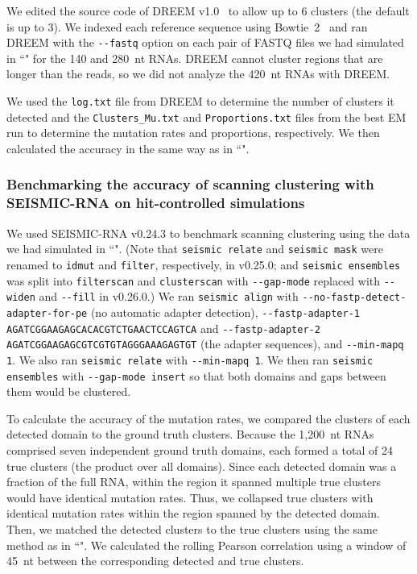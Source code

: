 \documentclass[unnumsec,webpdf,contemporary,large]{oup-authoring-template}%
\theoremstyle{thmstyleone}%
\theoremstyle{thmstyletwo}%
\theoremstyle{thmstylethree}%
\begin{document}
We edited the source code of DREEM v1.0~\cite{Tomezsko2020} to allow up to 6 clusters (the default is up to 3).
We indexed each reference sequence using Bowtie~2~\cite{Langmead2012} and ran DREEM with the \verb|--fastq| option on each pair of FASTQ files we had simulated in ``" for the 140 and 280~nt RNAs.
DREEM cannot cluster regions that are longer than the reads, so we did not analyze the 420~nt RNAs with DREEM.

We used the \verb|log.txt| file from DREEM to determine the number of clusters it detected and the \verb|Clusters_Mu.txt| and \verb|Proportions.txt| files from the best EM run to determine the mutation rates and proportions, respectively.
We then calculated the accuracy in the same way as in ``".

\subsubsection{Benchmarking the accuracy of scanning clustering with SEISMIC-RNA on hit-controlled simulations}
\label{benchmark-clusterscan-seismic}

We used SEISMIC-RNA v0.24.3 to benchmark scanning clustering using the data we had simulated in ``".
(Note that \verb|seismic relate| and \verb|seismic mask| were renamed to \verb|idmut| and \verb|filter|, respectively, in v0.25.0; and \verb|seismic ensembles| was split into \verb|filterscan| and \verb|clusterscan| with \verb|--gap-mode| replaced with \verb|--widen| and \verb|--fill| in v0.26.0.)
We ran \verb|seismic align| with \verb|--no-fastp-detect-adapter-for-pe| (no automatic adapter detection), \verb|--fastp-adapter-1 AGATCGGAAGAGCACACGTCTGAACTCCAGTCA| and \verb|--fastp-adapter-2 AGATCGGAAGAGCGTCGTGTAGGGAAAGAGTGT| (the adapter sequences), and \verb|--min-mapq 1|.
We also ran \verb|seismic relate| with \verb|--min-mapq 1|.
We then ran \verb|seismic ensembles| with \verb|--gap-mode insert| so that both domains and gaps between them would be clustered.

To calculate the accuracy of the mutation rates, we compared the clusters of each detected domain to the ground truth clusters.
Because the 1,200~nt RNAs comprised seven independent ground truth domains, each formed a total of 24 true clusters (the product over all domains).
Since each detected domain was a fraction of the full RNA, within the region it spanned multiple true clusters would have identical mutation rates.
Thus, we collapsed true clusters with identical mutation rates within the region spanned by the detected domain.
Then, we matched the detected clusters to the true clusters using the same method as in ``".
We calculated the rolling Pearson correlation using a window of 45~nt between the corresponding detected and true clusters.
\end{document}
